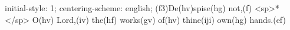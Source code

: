 initial-style: 1;
centering-scheme: english;
(f3)De(hv)spise(hg) not,(f) <sp>*</sp> O(hv) Lord,(iv) the(hf) works(gv) of(hv) thine(iji) own(hg) hands.(ef)
